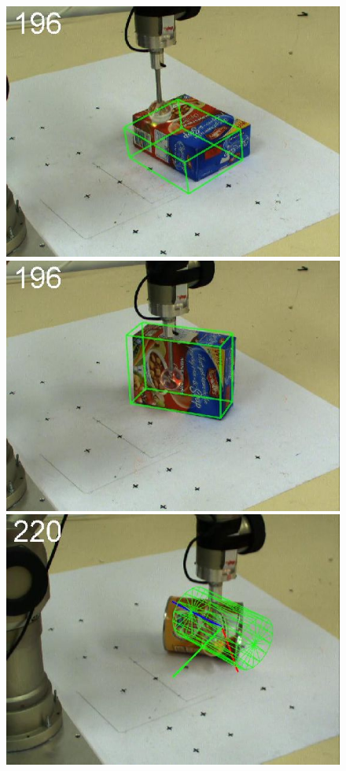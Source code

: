 \begin{figure}[htbp]
{\includegraphics[width=\imgAXwid]{images/A2_LWPR1_399_4}
\includegraphics[width=\imgAXwid]{images/A2_2exp_87_4}
\includegraphics[width=\imgAXwid]{images/A3_2exp_39_4}
}
\end{figure}
